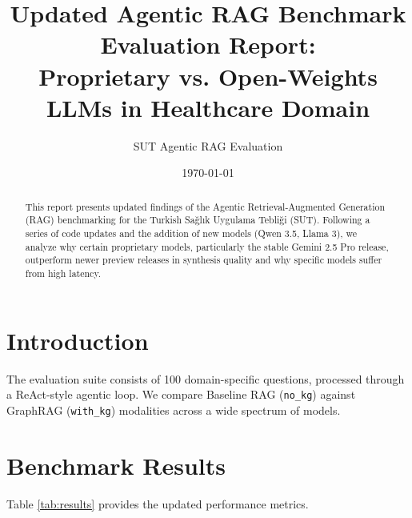 \documentclass[11pt, a4paper]{article}
\title{Updated Agentic RAG Benchmark Evaluation Report: \\ Proprietary vs. Open-Weights LLMs in Healthcare Domain}
\author{SUT Agentic RAG Evaluation}
\date{\today}
\begin{document}
\maketitle

\begin{abstract}
This report presents updated findings of the Agentic Retrieval-Augmented Generation (RAG) benchmarking for the Turkish Sağlık Uygulama Tebliği (SUT). Following a series of code updates and the addition of new models (Qwen 3.5, Llama 3), we analyze why certain proprietary models, particularly the stable Gemini 2.5 Pro release, outperform newer preview releases in synthesis quality and why specific models suffer from high latency.
\end{abstract}

\section{Introduction}
The evaluation suite consists of 100 domain-specific questions, processed through a ReAct-style agentic loop. We compare Baseline RAG (\texttt{no\_kg}) against GraphRAG (\texttt{with\_kg}) modalities across a wide spectrum of models.

\section{Benchmark Results}

Table \ref{tab:results} provides the updated performance metrics.
\end{document}
